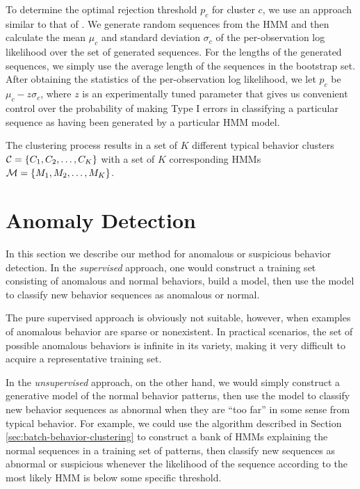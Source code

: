 To determine the optimal rejection threshold $p_c$ for cluster $c$, we
use an approach similar to that of . We
generate random sequences from the HMM and then calculate the mean
$\mu_c$ and standard deviation $\sigma_c$ of the per-observation log
likelihood over the set of generated sequences.  For the lengths of
the generated sequences, we simply use the average length of the
sequences in the bootstrap set.  After obtaining the statistics of the
per-observation log likelihood, we let $p_c$ be $\mu_c - z \sigma_c$,
where $z$ is an experimentally tuned parameter that gives us
convenient control over the probability of making Type I errors in
classifying a particular sequence as having been generated by a
particular HMM model.

The clustering process results in a set of $K$ different typical
behavior clusters ${\cal C} = \{ C_1, C_2, \ldots, C_K \}$ with a set
of $K$ corresponding HMMs ${\cal M} = \{ M_1, M_2, \ldots, M_K \}$.

\section{Anomaly Detection}
\label{sec:batch-anomaly-detection}

In this section we describe our method for anomalous or suspicious
behavior detection. In the \textit{supervised} approach, one would
construct a training set consisting of anomalous and normal behaviors,
build a model, then use the model to classify new behavior sequences
as anomalous or normal.

The pure supervised approach is obviously not suitable, however, when
examples of anomalous behavior are sparse or nonexistent.  In
practical scenarios, the set of possible anomalous behaviors is
infinite in its variety, making it very difficult to acquire a
representative training set.

In the \textit{unsupervised} approach, on the other hand, we would
simply construct a generative model of the normal behavior patterns,
then use the model to classify new behavior sequences as abnormal when
they are ``too far'' in some sense from typical behavior.  For
example, we could use the algorithm described in
Section \ref{sec:batch-behavior-clustering} to construct a bank of
HMMs explaining the normal sequences in a training set of patterns,
then classify new sequences as abnormal or suspicious whenever the
likelihood of the sequence according to the most likely HMM is below
some specific threshold.

